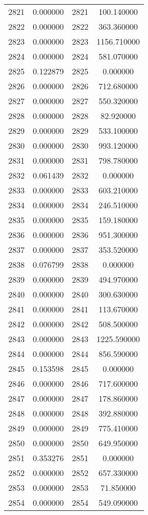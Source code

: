 \documentclass[12pt]{article}
\begin{document}
\begin{longtable}{@{}cccc@{}}
2821 & 0.000000 & 2821 & 100.140000 \\
2822 & 0.000000 & 2822 & 363.360000 \\
2823 & 0.000000 & 2823 & 1156.710000 \\
2824 & 0.000000 & 2824 & 581.070000 \\
2825 & 0.122879 & 2825 & 0.000000 \\
2826 & 0.000000 & 2826 & 712.680000 \\
2827 & 0.000000 & 2827 & 550.320000 \\
2828 & 0.000000 & 2828 & 82.920000 \\
2829 & 0.000000 & 2829 & 533.100000 \\
2830 & 0.000000 & 2830 & 993.120000 \\
2831 & 0.000000 & 2831 & 798.780000 \\
2832 & 0.061439 & 2832 & 0.000000 \\
2833 & 0.000000 & 2833 & 603.210000 \\
2834 & 0.000000 & 2834 & 246.510000 \\
2835 & 0.000000 & 2835 & 159.180000 \\
2836 & 0.000000 & 2836 & 951.300000 \\
2837 & 0.000000 & 2837 & 353.520000 \\
2838 & 0.076799 & 2838 & 0.000000 \\
2839 & 0.000000 & 2839 & 494.970000 \\
2840 & 0.000000 & 2840 & 300.630000 \\
2841 & 0.000000 & 2841 & 113.670000 \\
2842 & 0.000000 & 2842 & 508.500000 \\
2843 & 0.000000 & 2843 & 1225.590000 \\
2844 & 0.000000 & 2844 & 856.590000 \\
2845 & 0.153598 & 2845 & 0.000000 \\
2846 & 0.000000 & 2846 & 717.600000 \\
2847 & 0.000000 & 2847 & 178.860000 \\
2848 & 0.000000 & 2848 & 392.880000 \\
2849 & 0.000000 & 2849 & 775.410000 \\
2850 & 0.000000 & 2850 & 649.950000 \\
2851 & 0.353276 & 2851 & 0.000000 \\
2852 & 0.000000 & 2852 & 657.330000 \\
2853 & 0.000000 & 2853 & 71.850000 \\
2854 & 0.000000 & 2854 & 549.090000 \\

\end{longtable}
\end{document}
